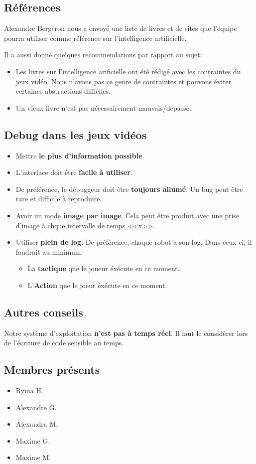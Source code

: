 \documentclass[12pt,letterpaper,twoside]{article}
\begin{document}
\subsection*{Références}
Alexandre Bergeron nous a envoyé une liste de livres et de sites que l'équipe pourra utiliser comme référence sur l'intelligence artificielle.

Il a aussi donné quelques recommendations par rapport au sujet:
\begin{itemize}
\item Les livres sur l'intelligence arificielle ont été rédigé avec les contraintes du jeux vidéo.
Nous n'avons pas ce genre de contraintes et pouvons éviter certaines abstractions difficiles.
\item Un vieux livre n'est pas nécessairement mauvais/dépassé.
\end{itemize}

\subsection*{Debug dans les jeux vidéos}
\begin{itemize}
\item Mettre \textbf{le plus d'information possible}.
\item L'interface doit être \textbf{facile à utiliser}.
\item De préférence, le débuggeur doit être \textbf{toujours allumé}.
Un bug peut être rare et difficile à reproduire.
\item Avoir un mode \textbf{image par image}.
Cela peut être produit avec une prise d'image à chque intervalle de temps <<x>>.
\item Utiliser \textbf{plein de log}.
De préférence, chaque robot a son log.
Dans ceux-ci, il faudrait au minimum:
\begin{itemize}
\item La \textbf{tactique} que le joueur éxécute en ce moment.
\item L'\textbf{Action} que le joeur éxécute en ce moment.
\end{itemize}

\end{itemize}

\subsection*{Autres conseils}
Notre système d'exploitation \textbf{n'est pas à temps réel}.
Il faut le considérer lors de l'écriture de code sensible au temps.

\subsection*{Membres présents}
\begin{itemize}
\item Ryma H.
\item Alexandre G.
\item Alexandra M.
\item Maxime G.
\item Maxime M.
\end{itemize}
\end{document}
